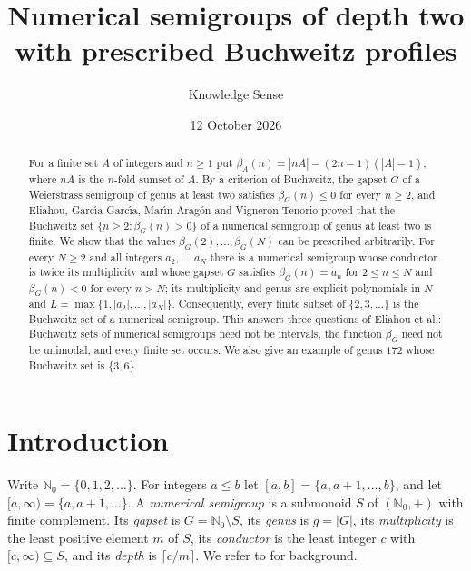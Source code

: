 \documentclass[11pt]{amsart}
\theoremstyle{definition}
\theoremstyle{remark}
\numberwithin{equation}{section}
\newcommand{\NN}{\mathbb{N}_0}
\begin{document}
\title[Prescribed Buchweitz profiles]{Numerical semigroups of depth two with prescribed Buchweitz profiles}

\author{Knowledge Sense}

\date{12 October 2026}



\begin{abstract}
For a finite set $A$ of integers and $n\ge 1$ put $\beta_A(n)=|nA|-(2n-1)(|A|-1)$, where $nA$ is the $n$-fold sumset of $A$. By a criterion of Buchweitz, the gapset $G$ of a Weierstrass semigroup of genus at least two satisfies $\beta_G(n)\le 0$ for every $n\ge 2$, and Eliahou, Garc\'{\i}a-Garc\'{\i}a, Mar\'{\i}n-Arag\'on and Vigneron-Tenorio proved that the Buchweitz set $\{n\ge 2:\beta_G(n)>0\}$ of a numerical semigroup of genus at least two is finite. We show that the values $\beta_G(2),\dots,\beta_G(N)$ can be prescribed arbitrarily. For every $N\ge 2$ and all integers $a_2,\dots,a_N$ there is a numerical semigroup whose conductor is twice its multiplicity and whose gapset $G$ satisfies $\beta_G(n)=a_n$ for $2\le n\le N$ and $\beta_G(n)<0$ for every $n>N$; its multiplicity and genus are explicit polynomials in $N$ and $L=\max\{1,|a_2|,\dots,|a_N|\}$. Consequently, every finite subset of $\{2,3,\dots\}$ is the Buchweitz set of a numerical semigroup. This answers three questions of Eliahou et al.: Buchweitz sets of numerical semigroups need not be intervals, the function $\beta_G$ need not be unimodal, and every finite set occurs. We also give an example of genus $172$ whose Buchweitz set is $\{3,6\}$.
\end{abstract}

\maketitle

\section{Introduction}

Write $\NN=\{0,1,2,\dots\}$. For integers $a\le b$ let $[a,b]=\{a,a+1,\dots,b\}$, and let $[a,\infty)=\{a,a+1,\dots\}$. A \emph{numerical semigroup} is a submonoid $S$ of $(\NN,+)$ with finite complement. Its \emph{gapset} is $G=\NN\setminus S$, its \emph{genus} is $g=|G|$, its \emph{multiplicity} is the least positive element $m$ of $S$, its \emph{conductor} is the least integer $c$ with $[c,\infty)\subseteq S$, and its \emph{depth} is $\lceil c/m\rceil$. We refer to \cite{RGS09} for background.
\end{document}
